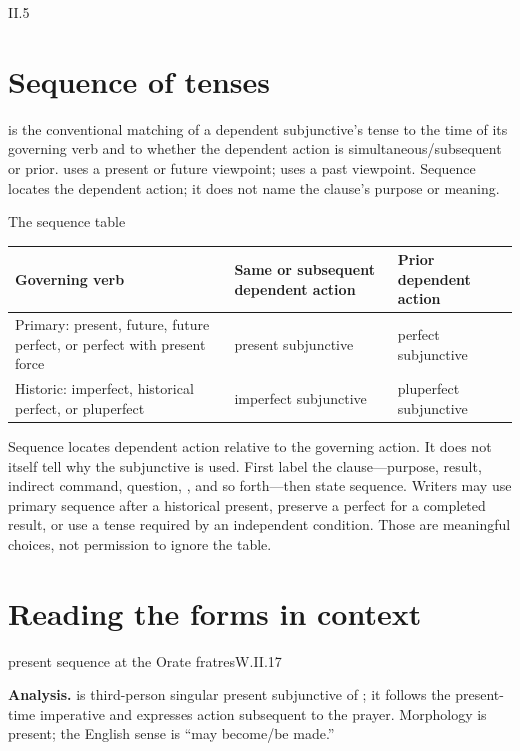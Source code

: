 \begin{courseunit}{II.5}
\section{Sequence of tenses}

 is the conventional matching of a dependent
subjunctive's tense to the time of its governing verb and to whether the
dependent action is simultaneous/subsequent or prior. 
uses a present or future viewpoint;  uses a past
viewpoint. Sequence locates the dependent action; it does not name the clause's
purpose or meaning.

\begin{grammarbox}{The sequence table}
\begin{center}
\begin{tabularx}{0.92\linewidth}{@{}P{1.4in}Y Y@{}}
\toprule
\textbf{Governing verb} & \textbf{Same or subsequent dependent action} &
\textbf{Prior dependent action}\\ \midrule
Primary: present, future, future perfect, or perfect with present force & present subjunctive &
perfect subjunctive\\
Historic: imperfect, historical perfect, or pluperfect & imperfect subjunctive & pluperfect
subjunctive\\
\bottomrule
\end{tabularx}
\end{center}

Sequence locates dependent action relative to the governing action.  It does not itself tell
why the subjunctive is used.  First label the clause---purpose, result, indirect command,
question, , and so forth---then state sequence.  Writers may use primary sequence
after a historical present, preserve a perfect for a completed result, or use a tense required
by an independent condition.  Those are meaningful choices, not permission to ignore the
table.
\end{grammarbox}

\section{Reading the forms in context}

\begin{workedexample}{present sequence at the Orate fratres}{W.II.17}

\textbf{Analysis.}   is third-person singular present subjunctive of ;
it follows the present-time imperative  and expresses action subsequent to the
prayer.  Morphology is present; the English sense is ``may become/be made.''


\end{workedexample}
\end{courseunit}
